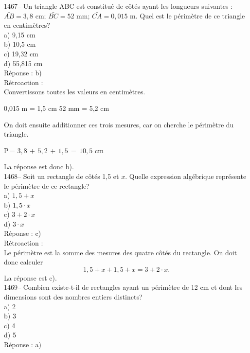 1467-- Un triangle ABC est constitu\'e de c\^ot\'es ayant les
longueurs suivantes : \vskip 10pt $\bar{AB}= 3,8$ cm; \vskip 10pt
$\bar{BC}= 52$ mm; \vskip 10pt $\bar{CA}= 0,015$ m. \vskip15pt
\noindent
Quel est le p\'erim\`etre de ce triangle en centim\`etres?\\
a) 9,15 cm\\
b) 10,5 cm\\
c) 19,32 cm\\
d) 55,815 cm\\

R\'eponse : b)\\

R\'etroaction :\\
Convertissons toutes les valeurs en centim\`etres.
\begin{center}
\vskip 10pt 0,015
m = 1,5 cm \vskip 10pt 52 mm = 5,2 cm \vskip 15pt \noindent
\end{center}
On doit
ensuite additionner ces trois mesures, car on cherche le
p\'erim\`etre du triangle.
\begin{center}
P\,=\,\,$3,8\,+\,5,2\,+\,1,5\,=\,10,5$\,\,cm
\end{center}
La r\'eponse est donc b).\\

1468-- Soit un rectangle de c\^ot\'es 1,5 et $x$. Quelle expression
alg\'ebrique
repr\'esente le p\'erim\`etre de ce rectangle?\\
a) $1,5 + x$\\
b) $1,5\cdot x$\\
c) $3+2\cdot x$\\
d) $3\cdot x$\\

R\'eponse : c)\\

R\'etroaction :\\
Le p\'erim\`etre est la somme des mesures des quatre c\^ot\'es du
rectangle. On doit donc calculer $$1,5 + x + 1,5 + x = 3 +2\cdot x.$$ La
r\'eponse est c).\\


1469-- Combien existe-t-il de rectangles ayant un p\'erim\`etre de 12
cm et dont les dimensions sont des nombres entiers distincts?\\
a) 2\\
b) 3\\
c) 4\\
d) 5\\

R\'eponse : a)\\

